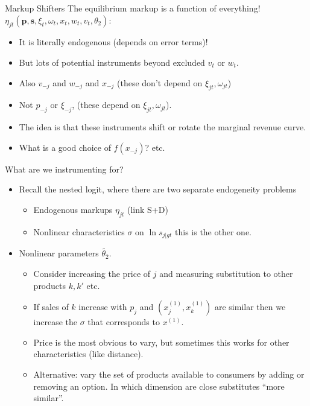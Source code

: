 \documentclass[xcolor=pdftex,dvipsnames,table,mathserif,aspectratio=169]{beamer}
\begin{document}
\begin{frame}{Markup Shifters}
The equilibrium markup is a function of \alert{everything!} $\eta_{jt}(\mathbf{p},\mathbf{s},\xi_t,\omega_t,x_{t},w_{t},v_t,\theta_2)$:
\begin{itemize}
\item It is literally \alert{endogenous} (depends on error terms)!
\item But lots of potential instruments beyond \alert{excluded} $v_t$ or $w_t$.
\item Also $v_{-j}$ and $w_{-j}$ and $x_{-j}$ (these don't depend on $\xi_{jt},\omega_{jt}$)
\item Not $p_{-j}$ or $\xi_{-j}$, (these depend on $\xi_{jt},\omega_{jt}$).
\item The idea is that these instruments shift or rotate the \alert{marginal revenue curve}.
\item What is a good choice of $f(x_{-j})$? etc.
\end{itemize}
\end{frame}

\begin{frame}{What are we instrumenting for?}
\begin{itemize}
\item Recall the nested logit, where there are two separate endogeneity problems
\begin{itemize}
\item Endogenous \alert{markups} $\eta_{jt}$ (link S+D)
\item \alert{Nonlinear characteristics} $\sigma$ on $\ln s_{j|gt}$ this is the other one.
\end{itemize}
\item Nonlinear parameters $\widetilde{\theta_2}$.
\begin{itemize}
\item Consider increasing the price of $j$ and measuring substitution to other products $k,k'$ etc.
\item If sales of $k$ increase with $p_j$ and $(x_j^{(1)},x_k^{(1)})$ are similar then we increase the $\sigma$ that corresponds to $x^{(1)}$.
\item Price is the most obvious to vary, but sometimes this works for other characteristics (like distance).
\item Alternative: vary the set of products available to consumers by adding or removing an option. In which dimension are close substitutes ``more similar''.
\end{itemize}
\end{itemize}
\end{frame}
\end{document}
